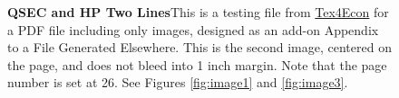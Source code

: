 \documentclass{article}
\newcommand{\mycaption}[2]{%
  \caption[#1]{\textbf{#1}\newline\normalsize#2}%
}
\begin{document}
\pagebreak
\clearpage

\setcounter{page}{26}

\begin{figure}[p]
\hspace*{-\dimexpr\oddsidemargin+1in\relax}
\mycaption{QSEC and HP Two Lines}{This is a testing file from \href{https://fanwangecon.github.io/Tex4Econ/}{Tex4Econ} for a PDF file including only images, designed as an add-on Appendix to a File Generated Elsewhere. This is the second image, centered on the page, and does not bleed into 1 inch margin. Note that the page number is set at 26. See Figures \ref{fig:image1} and \ref{fig:image3}. \label{fig:image2}}
\hspace*{-\paperwidth}
\end{figure}

\pagebreak
\clearpage


\setcounter{page}{1}
\end{document}
